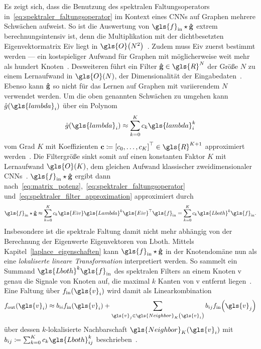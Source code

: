 Es zeigt sich, dass die Benutzung des spektralen Faltungsoperators in~\eqref{eq:spektraler_faltungsoperator} im Kontext eines \glspl{CNN} auf Graphen mehrere Schwächen aufweist.
So ist \zB{} die Auswertung von $\gls{f}_{\mathrm{in}} \star \ve{\hat g}$ extrem berechnungsintensiv ist, denn die Multiplikation mit der dichtbesetzten Eigenvektormatrix \gls{Eiv} liegt in $\gls{O}\left(N^2\right)$~\cite{Defferrard}.
Zudem muss \gls{Eiv} zuerst bestimmt werden — ein kostspieliger Aufwand für Graphen mit möglicherweise weit mehr als hundert Knoten~\cite{gcn}.
Desweiteren führt ein Filter $\ve{\hat g} \in \gls{R}^N$ der Größe $N$ zu einem Lernaufwand in $\gls{O}\left(N\right)$, \dhe{} der Dimensionalität der Eingabedaten~\cite{Defferrard}.
Ebenso kann $\mathbf{\hat g}$ so nicht für das Lernen auf Graphen mit variierendem $N$ verwendet werden.
Um die oben genannten Schwächen zu umgehen kann $\hat g\left(\gls{lambda}_i\right)$ über ein Polynom\begin{equation}
  \hat g\left(\gls{lambda}_i\right) \approx \sum_{k=0}^K c_k\gls{lambda}_i^k
  \label{eq:spektraler_filter_approximation}
\end{equation}
vom Grad $K$ mit Koeffizienten $\ve{c} \coloneqq {\left[c_0, \ldots, c_K\right]}^{\top} \in \gls{R}^{K+1}$ approximiert werden~\cite{Hammond, Defferrard}.
Die Filtergröße sinkt somit auf einen konstanten Faktor $K$ mit Lernaufwand $\gls{O}\left(K\right)$, dem gleichen Aufwand klassischer zweidimensionaler \glspl{CNN}~\cite{Defferrard}.
$\gls{f}_{\mathrm{in}} \star \ve{\hat g}$ ergibt dann nach~\eqref{eq:matrix_potenz},~\eqref{eq:spektraler_faltungsoperator} und~\eqref{eq:spektraler_filter_approximation} approximiert durch~\cite{Defferrard}
\begin{equation}
  \gls{f}_{\mathrm{in}} \star \ve{\hat g} \approx \sum_{k=0}^K c_k\gls{Eiv}\gls{Lambda}^k\gls{Eiv}^{\top}\gls{f}_{\mathrm{in}} = \sum_{k=0}^K c_k \gls{Lboth}^k \gls{f}_{\mathrm{in}}.
  \label{eq:spektraler_faltungsoperator_approximation}
\end{equation}
Insbesondere ist die spektrale Faltung damit nicht mehr abhängig von der Berechnung der Eigenwerte \bzw{} Eigenvektoren von \gls{Lboth}.
Mittels Kapitel~\ref{laplace_eigenschaften} kann $\gls{f}_{\mathrm{in}} \star \ve{\hat g}$ in der Knotendomäne nun als eine \emph{lokaliserte lineare Transformation} interpretiert werden.
So sammelt ein Summand $\gls{Lboth}^k\gls{f}_{\mathrm{in}}$ des spektralen Filters an einem Knoten \gls{v} genau die Signale von Knoten auf, die maximal $k$ Kanten von \gls{v} entfernt liegen~\cite{Hammond}.
Eine Faltung über $f_{\mathrm{in}}\left(\gls{v}_i\right)$ wird damit als Linearkombination
\begin{equation*}
  f_{\mathrm{out}}\left(\gls{v}_i\right) \approx b_{ii} f_{\mathrm{in}}\left(\gls{v}_i\right) + \sum_{\gls{v}_j \in \gls{Neighbor}_K\left(\gls{v}_i\right)} b_{ij} f_{\mathrm{in}}\left(\gls{v}_j\right)
\end{equation*}
über dessen $k$-lokalisierte Nachbarschaft $\gls{Neighbor}_K\left(\gls{v}_i\right)$ mit $b_{ij} \coloneqq \sum_{k=0}^K c_k \gls{Lboth}^k_{ij}$ beschrieben~\cite{Shuman}.

